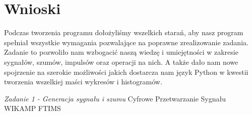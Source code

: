 \documentclass[12pt]{article}
\begin{document}
\section{Wnioski}
Podczas tworzenia programu dołożyliśmy wszelkich starań, aby nasz program spełniał wszystkie wymagania pozwalające na poprawne zrealizowanie zadania.
Zadanie to pozwoliło nam wzbogacić naszą wiedzę i umiejętności w zakresie sygnałów, szumów, impulsów oraz operacji na nich. A także dało nam nowe spojrzenie na szerokie możliwości jakich dostarcza nam język Python w kwestii tworzenia wszelkiej maści wykresów i histogramów.

\begin{thebibliography}{0}
\label{zad1}
\textit{Zadanie 1 - Generacja sygnału i szumu} Cyfrowe Przetwarzanie Sygnału WIKAMP FTIMS\newline
\end{thebibliography}
\end{document}
